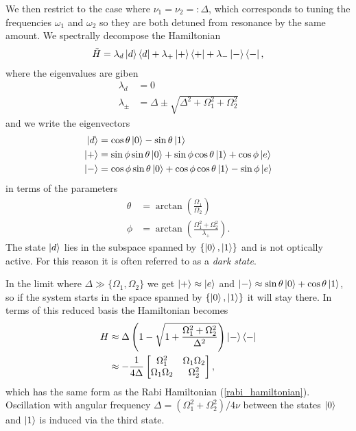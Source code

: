 We then restrict to the case where $\nu_1 = \nu_2 =: \Delta$, which corresponds to tuning the frequencies $\omega_1$ and $\omega_2$ so they are both detuned from resonance by the same amount. We spectrally decompose the Hamiltonian
\begin{align}
  \tilde{H} = \lambda_d \left\vert d\right\rangle\left\langle d\right\vert + \lambda_{+}\left\vert+\right\rangle\left\langle +\right\vert + \lambda_{-}\left\vert-\right\rangle\left\langle -\right\vert,
\end{align}
where the eigenvalues are giben 
\begin{align}
  \lambda_d &= 0 \\
  \lambda_\pm &= \Delta \pm \sqrt{\Delta^2 + \Omega_1^2 + \Omega_2^2}
\end{align}
and we write the eigenvectors
\begin{align}
  \ket{d} &%
  =\cos\theta \ket{0} - \sin\theta\ket{1} \\
  \ket{+} &%
  =\sin\phi \sin\theta \ket{0} + \sin\phi \cos\theta\ket{1}  + \cos\phi\ket{e}\\
  \ket{-} &%
  =\cos\phi \sin\theta \ket{0} + \cos\phi \cos\theta\ket{1}  - \sin\phi\ket{e}
\end{align}
in terms of the parameters
\begin{align}
  \theta &= \arctan\left(\frac{\Omega_1}{\Omega_2}\right)\\
  \phi &= \arctan\left(\frac{\Omega_1^2 + \Omega_2^2}{\lambda_{+}}\right).
\end{align}
The state $\left\vert d\right\rangle$ lies in the subspace spanned by $\{\left\vert0\right\rangle, \left\vert1\right\rangle\}$ and is not optically active. For this reason it is often referred to as a \textit{dark state}.

In the limit where $\Delta \gg \{\Omega_1, \Omega_2\}$ we get $\left\vert+\right\rangle \approx \left\vert e\right\rangle$ and $\left\vert-\right\rangle \approx \sin\theta\left\vert0\right\rangle + \cos\theta\left\vert1\right\rangle$, so if the system starts in the space spanned by $\{\left\vert0\right\rangle, \left\vert1\right\rangle\}$ it will stay there. In terms of this reduced basis the Hamiltonian becomes
\begin{align}
  H &\approx \Delta\left(1 - \sqrt{1 + \frac{\Omega_1^2 + \Omega_2^2}{\Delta^2}}\right)\left\vert-\right\rangle\left\langle -\right\vert \\
   &\approx -\frac{1}{4\Delta}
  \begin{bmatrix}
    \Omega_1^2 & \Omega_1 \Omega_2 \\
    \Omega_1\Omega_2 & \Omega_2^2
  \end{bmatrix},
\end{align}
which has the same form as the Rabi Hamiltonian (\ref{rabi_hamiltonian}). Oscillation with angular frequency $\Delta = (\Omega_1^2 + \Omega_2^2)/4\nu$ between the states $\left\vert0\right\rangle$ and $\left\vert1\right\rangle$ is induced via the third state.


